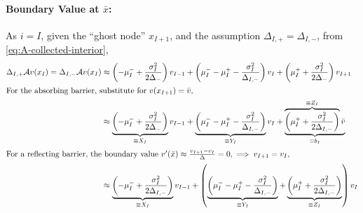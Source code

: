 \documentclass[11pt]{etk-article}
\begin{document}
\paragraph{Boundary Value at $\bar{x}$:}
As $i=I$, given the ``ghost node'' $x_{I+1}$, and the assumption  $\Delta_{I,+} = \Delta_{I,-}$, from \cref{eq:A-collected-interior},
\begin{align}
\Delta_{I,+} \mathcal{A} v(x_I) = \Delta_{I,-} \mathcal{A} v(x_I)&\approx \left(-\mu_I^{-} +\frac{\sigma_I^2}{2 \Delta_{-}}\right)v_{I-1} + \left(\mu_I^{-} - \mu_I^{+}-\frac{\sigma_I^2}{\Delta_{I,-}}\right)v_I + \left(\mu_I^{+} + \frac{\sigma_I^2}{2 \Delta_{-}}\right)v_{I+1}\\
\intertext{For the absorbing barrier, substitute for $v(x_{I+1}) = \bar{v}$,}
&\approx \underbrace{\left(-\mu_I^{-} +\frac{\sigma_I^2}{2 \Delta_{-}}\right)}_{\equiv X_I} v_{I-1} + \underbrace{\left(\mu_I^{-} - \mu_I^{+}-\frac{\sigma_I^2}{\Delta_{I,-}}\right)}_{\equiv Y_I} v_I + \underbrace{\overbrace{\left(\mu_I^{+} + \frac{\sigma_I^2}{2 \Delta_{I,-}}\right)}^{\equiv Z_I}\bar{v}}_{\equiv b_I}\\
\intertext{For a reflecting barrier, the boundary value $v'(\bar{x}) \approx \frac{v_{I+1}-v_I}{\Delta} = 0, \implies v_{I+1} = v_I$,}
&\approx \underbrace{\left(-\mu_I^{-} +\frac{\sigma_I^2}{2 \Delta_{I,-}}\right)}_{\equiv X_I} v_{I-1} + \left(\underbrace{\left(\mu_I^{-} - \mu_I^{+}-\frac{\sigma_I^2}{\Delta_{I,-}}\right)}_{\equiv Y_I} + \underbrace{\left(\mu_I^{+} + \frac{\sigma_I^2}{2 \Delta_{I,-}}\right)}_{\equiv Z_I} \right) v_I \label{eq:reflecting-right-nonuniform}
\end{align}
\end{document}
